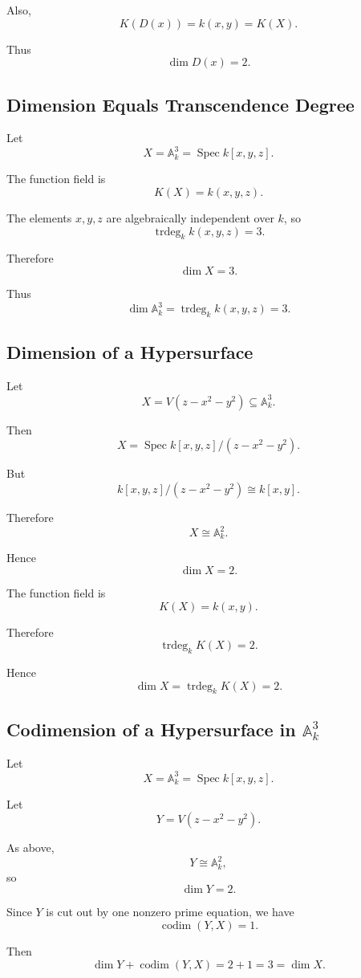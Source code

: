 \documentclass[12pt,a4paper]{article}
\theoremstyle{notespace}
\begin{document}
Also,
\[
K(D(x))=k(x,y)=K(X).
\]

Thus
\[
\boxed{\dim D(x)=2.}
\]

\subsection{Dimension Equals Transcendence Degree}

Let
\[
X=\mathbb A^3_k=\operatorname{Spec} k[x,y,z].
\]

The function field is
\[
K(X)=k(x,y,z).
\]

The elements \(x,y,z\) are algebraically independent over \(k\), so
\[
\operatorname{trdeg}_k k(x,y,z)=3.
\]

Therefore
\[
\dim X=3.
\]

Thus
\[
\boxed{\dim \mathbb A^3_k=\operatorname{trdeg}_k k(x,y,z)=3.}
\]

\subsection{Dimension of a Hypersurface}

Let
\[
X=V(z-x^2-y^2)\subseteq \mathbb A^3_k.
\]

Then
\[
X=\operatorname{Spec} k[x,y,z]/(z-x^2-y^2).
\]

But
\[
k[x,y,z]/(z-x^2-y^2)\cong k[x,y].
\]

Therefore
\[
X\cong \mathbb A^2_k.
\]

Hence
\[
\dim X=2.
\]

The function field is
\[
K(X)=k(x,y).
\]

Therefore
\[
\operatorname{trdeg}_k K(X)=2.
\]

Hence
\[
\boxed{\dim X=\operatorname{trdeg}_k K(X)=2.}
\]

\subsection{Codimension of a Hypersurface in \(\mathbb A^3_k\)}

Let
\[
X=\mathbb A^3_k=\operatorname{Spec} k[x,y,z].
\]

Let
\[
Y=V(z-x^2-y^2).
\]

As above,
\[
Y\cong \mathbb A^2_k,
\]
so
\[
\dim Y=2.
\]

Since \(Y\) is cut out by one nonzero prime equation, we have
\[
\operatorname{codim}(Y,X)=1.
\]

Then
\[
\dim Y+\operatorname{codim}(Y,X)
=
2+1
=
3
=
\dim X.
\]
\end{document}
